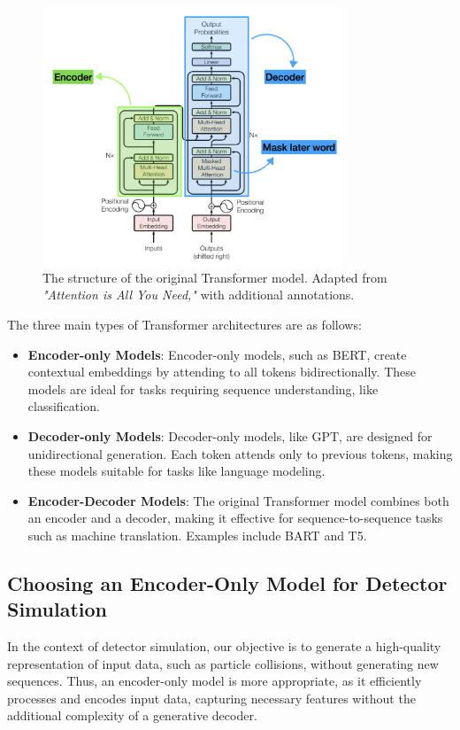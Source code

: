 \begin{figure}[ht]
    \centering
    \includegraphics[width=0.8\textwidth]{Figures/transformerblock.png}
    \caption{The structure of the original Transformer model. Adapted from \textit{"Attention is All You Need,"} with additional annotations.}
    \label{fig:transformer_structure}
\end{figure}

The three main types of Transformer architectures are as follows:

\begin{itemize}
    \item \textbf{Encoder-only Models}: Encoder-only models, such as BERT, create contextual embeddings by attending to all tokens bidirectionally. These models are ideal for tasks requiring sequence understanding, like classification.
    
    \item \textbf{Decoder-only Models}: Decoder-only models, like GPT, are designed for unidirectional generation. Each token attends only to previous tokens, making these models suitable for tasks like language modeling.
    
    \item \textbf{Encoder-Decoder Models}: The original Transformer model combines both an encoder and a decoder, making it effective for sequence-to-sequence tasks such as machine translation. Examples include BART and T5.
\end{itemize}

\subsection{Choosing an Encoder-Only Model for Detector Simulation}
In the context of detector simulation, our objective is to generate a high-quality representation of input data, such as particle collisions, without generating new sequences. Thus, an encoder-only model is more appropriate, as it efficiently processes and encodes input data, capturing necessary features without the additional complexity of a generative decoder.

